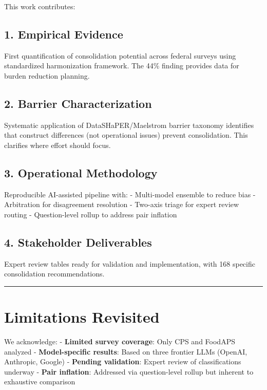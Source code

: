 \documentclass[
  letterpaper,
]{report}
\begin{document}
This work contributes:

\subsection{1. Empirical Evidence}\label{empirical-evidence}

First quantification of consolidation potential across federal surveys
using standardized harmonization framework. The 44\% finding provides
data for burden reduction planning.

\subsection{2. Barrier Characterization}\label{barrier-characterization}

Systematic application of DataSHaPER/Maelstrom barrier taxonomy
identifies that construct differences (not operational issues) prevent
consolidation. This clarifies where effort should focus.

\subsection{3. Operational Methodology}\label{operational-methodology}

Reproducible AI-assisted pipeline with: - Multi-model ensemble to reduce
bias - Arbitration for disagreement resolution - Two-axis triage for
expert review routing - Question-level rollup to address pair inflation

\subsection{4. Stakeholder Deliverables}\label{stakeholder-deliverables}

Expert review tables ready for validation and implementation, with 168
specific consolidation recommendations.

\begin{center}\rule{0.5\linewidth}{0.5pt}\end{center}

\section{Limitations Revisited}\label{limitations-revisited}

We acknowledge: - \textbf{Limited survey coverage}: Only CPS and FoodAPS
analyzed - \textbf{Model-specific results}: Based on three frontier LLMs
(OpenAI, Anthropic, Google) - \textbf{Pending validation}: Expert review
of classifications underway - \textbf{Pair inflation}: Addressed via
question-level rollup but inherent to exhaustive comparison
\end{document}
